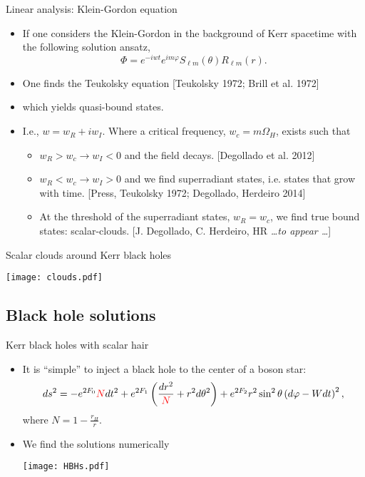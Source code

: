 \documentclass[xcolor=dvipsnames]{beamer}
\begin{document}
\begin{frame}{Linear analysis: Klein-Gordon equation}
  \begin{itemize}[<+->]
    \item If one considers the Klein-Gordon in the background of Kerr spacetime with the following solution ansatz,
      \begin{equation*}
        \Phi = e^{-iwt}e^{im\varphi}S_{\ell m}(\theta)R_{\ell m}(r).
      \end{equation*}
    \item One finds the Teukolsky equation \tiny{[Teukolsky 1972; Brill et al. 1972]} 
    \item which yields quasi-bound states.
    \item I.e., $w=w_R + i w_I$. Where a critical frequency, $w_c=m\Omega_H$, exists such that
      \begin{itemize}
        \item $w_R>w_c\rightarrow w_I<0$ and the field decays. \tiny{[Degollado et al. 2012]}
        \item $w_R<w_c\rightarrow w_I>0$ and we find superradiant states, i.e. states that grow with time. \tiny{[Press, Teukolsky 1972; Degollado, Herdeiro 2014]}
        \item At the threshold of the superradiant states, $w_R=w_c$, we find true bound states: scalar-clouds. \tiny{[J. Degollado, C. Herdeiro, HR \textit{\ldots to appear \ldots}]}
      \end{itemize}
  \end{itemize}
\end{frame}

\begin{frame}{Scalar clouds around Kerr black holes}
  \begin{center}
    \texttt{[image: clouds.pdf]}
  \end{center}
\end{frame}

\subsection{Black hole solutions}
\begin{frame}
  \tableofcontents[currentsubsection]
\end{frame}
\begin{frame}{Kerr black holes with scalar hair}
  \begin{itemize}[<+->]
    \item It is ``simple'' to inject a black hole to the center of a boson star:
      \begin{equation*}
        ds^2 = -e^{2F_0}\textcolor{red}{N}dt^2 + e^{2F_1}\left( \frac{dr^2}{\textcolor{red}{N}} + r^2d\theta^2 \right) + e^{2F_2}r^2\sin^2\theta\left( d\varphi-Wdt \right)^2, 
      \end{equation*}
      where $N=1-\frac{r_H}{r}$.
    \item We find the solutions numerically
      \begin{center}
        \texttt{[image: HBHs.pdf]}
      \end{center}
  \end{itemize}
\end{frame}
\end{document}
